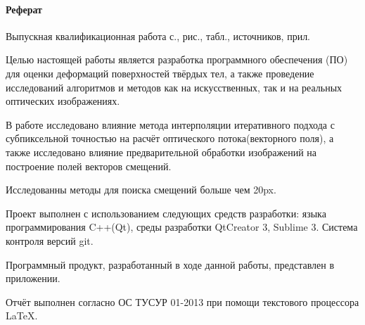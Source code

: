 \newpage
{}
\paragraph{\hfill Реферат \hfill}
Выпускная квалификационная работа  с.,  рис.,  табл.,  источников,  прил.

Целью настоящей работы является разработка программного обеспечения (ПО) для оценки деформаций поверхностей твёрдых тел, а также проведение исследований алгоритмов и методов как на искусственных, так и на реальных оптических изображениях.

В работе исследовано влияние метода интерполяции итеративного подхода с субпиксельной точностью на расчёт оптического потока(векторного поля), а также исследовано влияние предварительной обработки изображений на построение полей векторов смещений.

Исследованны методы для поиска смещений больше чем 20px. 

 

Проект выполнен с использованием следующих средств разработки: языка программирования C++(Qt), среды разработки QtCreator 3, Sublime 3. Система контроля версий git.

Программный продукт, разработанный в ходе данной работы, представлен в приложении.

Отчёт выполнен согласно ОС ТУСУР 01-2013 при помощи текстового процессора \LaTeX.